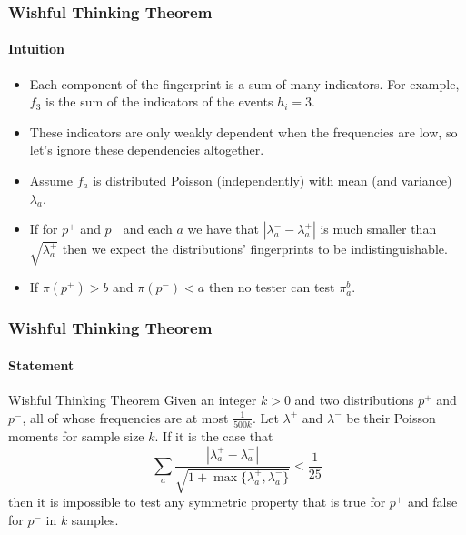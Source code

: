 \documentclass{beamer}
\begin{document}
\begin{frame}
  \frametitle{Wishful Thinking Theorem} \framesubtitle{Intuition}

  \begin{block}{}
    \begin{itemize}
    \item Each component of the fingerprint is a sum of many
      indicators. For example, $f_3$ is the sum of the indicators of
      the events $h_i=3$.
    \item These indicators are only weakly dependent when the
      frequencies are low, so let's ignore these dependencies
      altogether.
    \item Assume $f_a$ is distributed Poisson (independently) with mean
      (and variance) $\lambda_a$.
    \item If for $p^+$ and $p^-$ and each $a$ we have that
      $|\lambda^-_a-\lambda^+_a|$ is much smaller than
      $\sqrt{\lambda^+_a}$ then we expect the distributions'
      fingerprints to be indistinguishable.
    \item If $\pi(p^+)>b$ and $\pi(p^-)<a$ then no tester can test
      $\pi_a^b$.
    \end{itemize}
  \end{block}
\end{frame}


\begin{frame}
  \frametitle{Wishful Thinking Theorem} \framesubtitle{Statement}

  \begin{block}{Wishful Thinking Theorem}
    Given an integer $k>0$ and two distributions $p^+$ and $p^-$, all
    of whose frequencies are at most $\frac{1}{500k}$. Let $\lambda^+$
    and $\lambda^-$ be their Poisson moments for sample size $k$. If
    it is the case that
    \begin{equation*}
      \sum_a\frac{|\lambda^+_a-\lambda^-_a|}{\sqrt{1+\max\{\lambda^+_a,\lambda^-_a\}}}<\frac{1}{25}
    \end{equation*}
    then it is impossible to test any symmetric property that is true
    for $p^+$ and false for $p^-$ in $k$ samples.
  \end{block}

\end{frame}
\end{document}
